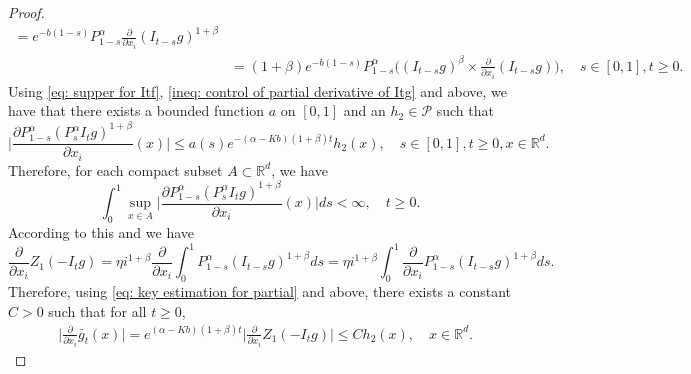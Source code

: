 \documentclass[12pt,a4paper]{amsart}
\theoremstyle{plain}
\theoremstyle{definition}
\numberwithin{equation}{section}
\begin{document}
\begin{proof}
\begin{align}
    = e^{-b(1-s)} P_{1-s}^\alpha \frac{\partial}{\partial x_i} (I_{t-s}g)^{1+\beta}
    \\&=(1+\beta)e^{-b(1-s)} P_{1-s}^\alpha \Big( (I_{t-s}g)^\beta \times \frac{\partial}{\partial x_i} (I_{t-s}g) \Big),\quad s\in [0,1], t\geq 0.
\end{align}
    Using \eqref{eq: supper for Itf}, \eqref{ineq: control of partial derivative of Itg} and above, we have that there exists a bounded function $a$ on $[0,1]$ and an $h_2 \in \mathcal P$ such that
\begin{equation}
\label{eq: key estimation for partial}
    \Big|\frac{\partial P_{1-s}^\alpha  (P_s^\alpha I_t g)^{1+\beta}}{\partial x_i}  (x)\Big| \leq a(s) e^{-(\alpha - Kb)(1+\beta)t}h_2(x),\quad s\in [0,1],t\geq 0, x\in \mathbb R^d.
\end{equation}
    Therefore, for each compact subset $A \subset \mathbb R^d$, we have
\[
    \int_0^1 \sup_{x\in A} \Big|\frac{\partial P_{1-s}^\alpha  (P_s^\alpha I_t g)^{1+\beta}}{\partial x_i}  (x)\Big| ds < \infty,\quad t\geq 0.
\] 
    According to this and \cite[Theorem A.5.2.]{Durrett2010Probability} we have
\[
    \frac{\partial}{\partial x_i} Z_1(-I_tg)
    = \eta i^{1+\beta}  \frac{\partial}{\partial x_i} \int_0^1 P_{1-s}^\alpha (I_{t-s}g)^{1+\beta} ds
    = \eta i^{1+\beta}  \int_0^1  \frac{\partial}{\partial x_i} P_{1-s}^\alpha (I_{t-s}g)^{1+\beta} ds.
\]
    Therefore, using \eqref{eq: key estimation for partial} and above, there exists a constant $C> 0$ such that for all $t\geq 0$, 
\begin{align}
    &\Big|\frac{\partial}{\partial x_i}\bar{g}_t(x)\Big| 
    = e^{(\alpha-Kb)(1+\beta)t}\Big|\frac{\partial}{\partial x_i}Z_1(-I_tg)\Big| \leq C h_2(x),
    \quad x\in \mathbb R^d.
\end{align}

\end{proof}
\end{document}
